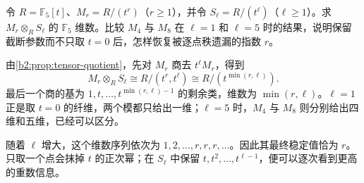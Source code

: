 \begin{exercise}\label{b2:ex:A-specialization-loses-multiplicity}
	令 \(R=\mathbb F_5[t]\)、\(M_r=R/(t^r)\)（\(r\ge1\)），并令 \(S_\ell=R/(t^\ell)\)（\(\ell\ge1\)）。求 \(M_r\otimes_R S_\ell\) 的 \(\mathbb F_5\) 维数。比较 \(M_4\) 与 \(M_8\) 在 \(\ell=1\) 和 \(\ell=5\) 时的结果，说明保留截断参数而不只取 \(t=0\) 后，怎样恢复被逐点秩遗漏的指数 \(r\)。
\end{exercise}
\begin{solution}
	由\cref{b2:prop:tensor-quotient}，先对 \(M_r\) 商去 \(t^\ell M_r\)，得到
	\[
		M_r\otimes_R S_\ell \cong R/(t^r,t^\ell) \cong R/(t^{\min(r,\ell)}).
	\]
	最后一个商的基为 \(1,t,\ldots,t^{\min(r,\ell)-1}\) 的剩余类，维数为 \(\min(r,\ell)\)。\(\ell=1\) 正是取 \(t=0\) 的纤维，两个模都只给出一维；\(\ell=5\) 时，\(M_4\) 与 \(M_8\) 则分别给出四维和五维，已经可以区分。

	随着 \(\ell\) 增大，这个维数序列依次为 \(1,2,\ldots,r,r,r,\ldots\)。因此其最终稳定值恰为 \(r\)。只取一个点会抹掉 \(t\) 的正次幂；在 \(S_\ell\) 中保留 \(t,t^2,\ldots,t^{\ell-1}\)，便可以逐次看到更高的重数信息。
\end{solution}
